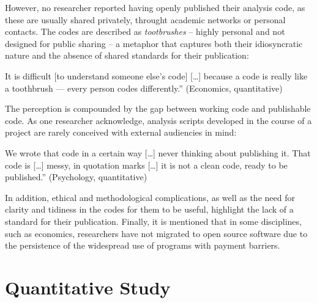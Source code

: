 \documentclass[
  english,
  letterpaper,
]{article}
\begin{document}
However, no researcher reported having openly published their analysis
code, as these are usually shared privately, throught academic networks
or personal contacts. The codes are described as \emph{tootbrushes} --
highly personal and not designed for public sharing -- a metaphor that
captures both their idiosyncratic nature and the absence of shared
standards for their publication:

\begin{tcolorbox}[enhanced jigsaw, opacityback=0, left=2mm, breakable, colframe=quarto-callout-color-frame, arc=.35mm, leftrule=.75mm, toprule=.15mm, bottomrule=.15mm, colback=white, rightrule=.15mm]

It is difficult {[}to understand someone else's code{]} {[}\ldots{]}
because a code is really like a toothbrush --- every person codes
differently.'' (Economics, quantitative)

\end{tcolorbox}

The perception is compounded by the gap between working code and
publishable code. As one researcher acknowledge, analysis scripts
developed in the course of a project are rarely conceived with external
audiencies in mind:

\begin{tcolorbox}[enhanced jigsaw, opacityback=0, left=2mm, breakable, colframe=quarto-callout-color-frame, arc=.35mm, leftrule=.75mm, toprule=.15mm, bottomrule=.15mm, colback=white, rightrule=.15mm]

We wrote that code in a certain way {[}\ldots{]} never thinking about
publishing it. That code is {[}\ldots{]} messy, in quotation marks
{[}\ldots{]} it is not a clean code, ready to be published.''
(Psychology, quantitative)

\end{tcolorbox}

In addition, ethical and methodological complications, as well as the
need for clarity and tidiness in the codes for them to be useful,
highlight the lack of a standard for their publication. Finally, it is
mentioned that in some disciplines, such as economics, researchers have
not migrated to open source software due to the persistence of the
widespread use of programs with payment barriers.

\section{Quantitative Study}\label{quantitative-study}
\end{document}
